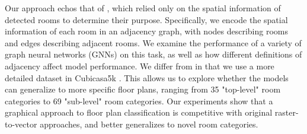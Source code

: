 \documentclass{article}
\begin{document}
Our approach echos that of \citet{floorgraphs2021}, which relied only on the spatial information of detected rooms to determine their purpose. Specifically, we encode the spatial information of each room in an adjacency graph, with nodes describing rooms and edges describing adjacent rooms. We examine the performance of a variety of graph neural networks (GNNs) on this task, as well as how different definitions of adjacency affect model performance. We differ from \citet{floorgraphs2021} in that we use a more detailed dataset in Cubicasa5k \cite{cubicasa5k}. This allows us to explore whether the models can generalize to more specific floor plans, ranging from 35 "top-level" room categories to 69 "sub-level" room categories. Our experiments show that a graphical approach to floor plan classification is competitive with original raster-to-vector approaches, and better generalizes to novel room categories.








\end{document}
